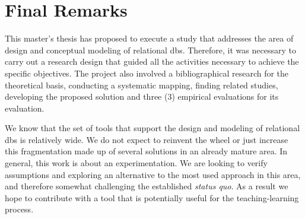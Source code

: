 \chapter{Final Remarks}
\label{chap:conclusion}

This master's thesis has proposed to execute a study that addresses the area of design and conceptual modeling of relational \acp{db}.
Therefore, it was necessary to carry out a research design that guided all the activities necessary to achieve the specific objectives.
The project also involved a bibliographical research for the theoretical basis, conducting a systematic mapping, finding related studies, developing the proposed solution and three (3) empirical evaluations for its evaluation.

We know that the set of tools that support the design and modeling of relational \acp{db} is relatively wide.
We do not expect to reinvent the wheel or just increase this fragmentation made up of several solutions in an already mature area.
In general, this work is about an experimentation.
We are looking to verify assumptions and exploring an alternative to the most used approach in this area, and therefore somewhat challenging the established \textit{status quo}.
As a result we hope to contribute with a tool that is potentially useful for the teaching-learning process.

